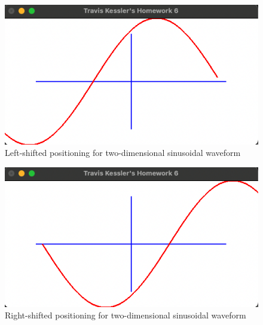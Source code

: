 \documentclass{report}
\begin{document}
	\begin{figure}[!ht]
		\centering
		\includegraphics[scale=0.7, trim={0 0.05cm 0 0.0cm}, clip]{figures/2d_l.png}
		\caption{Left-shifted positioning for two-dimensional sinusoidal waveform}
	\end{figure}

	\begin{figure}[!ht]
		\centering
		\includegraphics[scale=0.7, trim={0 0.05cm 0 0.0cm}, clip]{figures/2d_r.png}
		\caption{Right-shifted positioning for two-dimensional sinusoidal waveform}
	\end{figure}
\end{document}
